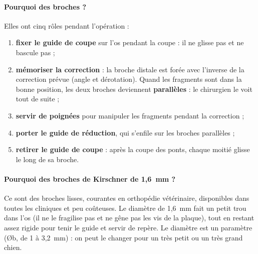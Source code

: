 \documentclass[11pt,a4paper]{article}
\begin{document}
\paragraph{Pourquoi des broches ?} Elles ont cinq rôles pendant l'opération :
\begin{enumerate}
  \item \textbf{fixer le guide de coupe} sur l'os pendant la coupe : il ne glisse pas et ne bascule pas ;
  \item \textbf{mémoriser la correction} : la broche distale est forée avec l'inverse de la correction prévue (angle et
        dérotation). Quand les fragments sont dans la bonne position, les deux broches deviennent
        \textbf{parallèles} : le chirurgien le voit tout de suite ;
  \item \textbf{servir de poignées} pour manipuler les fragments pendant la correction ;
  \item \textbf{porter le guide de réduction}, qui s'enfile sur les broches parallèles ;
  \item \textbf{retirer le guide de coupe} : après la coupe des ponts, chaque moitié glisse le long de sa broche.
\end{enumerate}

\paragraph{Pourquoi des broches de Kirschner de 1,6~mm ?} Ce sont des broches lisses, courantes en orthopédie
vétérinaire, disponibles dans toutes les cliniques et peu coûteuses. Le diamètre de 1,6~mm fait un petit trou dans l'os (il ne le fragilise pas et ne gêne pas les vis de la plaque),
tout en restant assez rigide pour tenir le guide et servir de repère. Le diamètre est un paramètre (Øb, de 1 à
3,2~mm) : on peut le changer pour un très petit ou un très grand chien.
\end{document}
